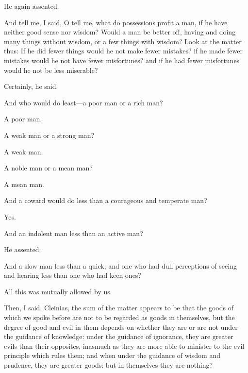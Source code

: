 \documentclass[11pt,letter]{article}
\begin{document}
\par  He again assented.

\par  And tell me, I said, O tell me, what do possessions profit a man, if he have neither good sense nor wisdom? Would a man be better off, having and doing many things without wisdom, or a few things with wisdom? Look at the matter thus: If he did fewer things would he not make fewer mistakes? if he made fewer mistakes would he not have fewer misfortunes? and if he had fewer misfortunes would he not be less miserable?

\par  Certainly, he said.

\par  And who would do least—a poor man or a rich man?

\par  A poor man.

\par  A weak man or a strong man?

\par  A weak man.

\par  A noble man or a mean man?

\par  A mean man.

\par  And a coward would do less than a courageous and temperate man?

\par  Yes.

\par  And an indolent man less than an active man?

\par  He assented.

\par  And a slow man less than a quick; and one who had dull perceptions of seeing and hearing less than one who had keen ones?

\par  All this was mutually allowed by us.

\par  Then, I said, Cleinias, the sum of the matter appears to be that the goods of which we spoke before are not to be regarded as goods in themselves, but the degree of good and evil in them depends on whether they are or are not under the guidance of knowledge: under the guidance of ignorance, they are greater evils than their opposites, inasmuch as they are more able to minister to the evil principle which rules them; and when under the guidance of wisdom and prudence, they are greater goods: but in themselves they are nothing?
\end{document}
